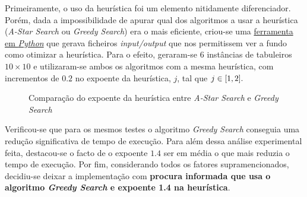 \documentclass[12pt]{exam}
\begin{document}
        \indent Primeiramente, o uso da heurística foi um elemento nitidamente diferenciador. Porém, dada a impossibilidade de apurar qual dos algoritmos a usar a heurística (\textit{A-Star Search} ou \textit{Greedy Search}) era o mais eficiente, criou-se uma \href{https://github.com/ImGugz/IA2122/blob/main/src/generator.py}{ferramenta em \textit{Python}} que gerava ficheiros \textit{input/output} que nos permitissem ver a fundo como otimizar a heurística. Para o efeito, geraram-se 6 instâncias de tabuleiros $10 \times 10$ e utilizaram-se ambos os algoritmos com a mesma heurística, com incrementos de $0.2$ no expoente da heurística, $j$, tal que $j \in \interval{1}{2}.$
        \vspace{-4.5mm}
        \begin{figure}[ht!]
        \centering
        \qquad
        \caption{Comparação do expoente da heurística entre \textit{A-Star Search} e \textit{Greedy Search}}%
        \label{fig:example}%
        \end{figure}

        \indent Verificou-se que para os mesmos testes o algoritmo \textit{Greedy Search} conseguia uma redução significativa de tempo de execução. Para além dessa análise experimental feita, destacou-se o facto de o expoente $1.4$ ser em média o que mais reduzia o tempo de execução. Por fim, considerando todos os fatores supramencionados, decidiu-se deixar a implementação com \textbf{procura informada que usa o algoritmo \textit{Greedy Search} e expoente 1.4 na heurística}.
\end{document}
